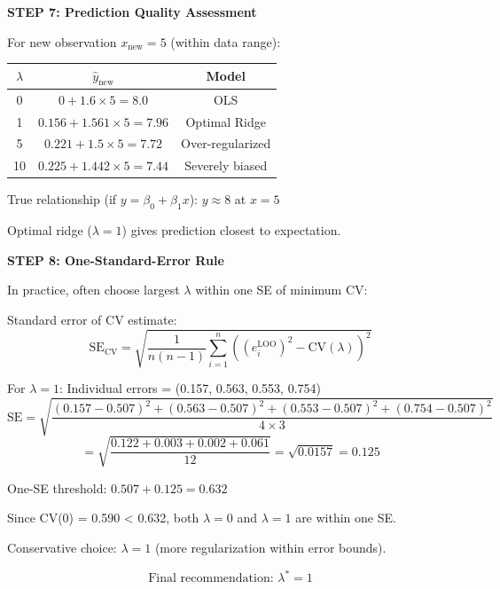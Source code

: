 \documentclass[12pt]{article}
\begin{document}
\begin{solution}
\textbf{STEP 7: Prediction Quality Assessment}

For new observation $x_{\text{new}} = 5$ (within data range):

\begin{center}
\begin{tabular}{c|c|c}
\hline
$\lambda$ & $\hat{y}_{\text{new}}$ & Model \\
\hline
0 & $0 + 1.6 \times 5 = 8.0$ & OLS \\
1 & $0.156 + 1.561 \times 5 = 7.96$ & Optimal Ridge \\
5 & $0.221 + 1.5 \times 5 = 7.72$ & Over-regularized \\
10 & $0.225 + 1.442 \times 5 = 7.44$ & Severely biased \\
\hline
\end{tabular}
\end{center}

True relationship (if $y = \beta_0 + \beta_1 x$): $y \approx 8$ at $x = 5$

Optimal ridge ($\lambda = 1$) gives prediction closest to expectation.

\textbf{STEP 8: One-Standard-Error Rule}

In practice, often choose largest $\lambda$ within one SE of minimum CV:

Standard error of CV estimate:
\[\text{SE}_{\text{CV}} = \sqrt{\frac{1}{n(n-1)}\sum_{i=1}^{n}\left((e_i^{\text{LOO}})^2 - \text{CV}(\lambda)\right)^2}\]

For $\lambda = 1$: Individual errors = (0.157, 0.563, 0.553, 0.754)
\[\text{SE} = \sqrt{\frac{(0.157-0.507)^2 + (0.563-0.507)^2 + (0.553-0.507)^2 + (0.754-0.507)^2}{4 \times 3}}\]
\[= \sqrt{\frac{0.122 + 0.003 + 0.002 + 0.061}{12}} = \sqrt{0.0157} = 0.125\]

One-SE threshold: $0.507 + 0.125 = 0.632$

Since CV(0) = 0.590 < 0.632, both $\lambda = 0$ and $\lambda = 1$ are within one SE.

Conservative choice: $\lambda = 1$ (more regularization within error bounds).

\[\boxed{\text{Final recommendation: } \lambda^* = 1}\]

\end{solution}
\end{document}
